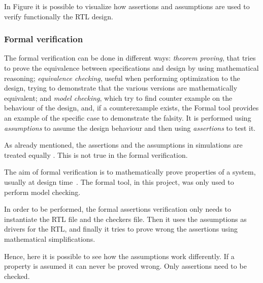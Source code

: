In Figure %
it is possible to visualize how assertions and assumptions are used to verify functionally the RTL design.

\subsubsection{Formal verification}
The formal verification can be done in different ways: \textit{theorem proving}, that tries to prove the equivalence between specifications and design by using mathematical reasoning; \textit{equivalence checking}, useful when performing optimization to the design, trying to demonstrate that the various versions are mathematically equivalent; and \textit{model checking}, which try to find counter example on the behaviour of the design, and, if a counterexample exists, the Formal tool provides an example of the specific case to demonstrate the falsity. It is performed using \emph{assumptions} to assume the design behaviour and then using \emph{assertions} to test it.


As already mentioned, the assertions and the assumptions in simulations are treated equally . This is not true in the formal verification.

The aim of formal veriﬁcation is to mathematically prove properties of a system, usually at design time~\cite{verification-book-2018-formal}.
The formal tool, in this project, was only used to perform model checking.

In order to be performed, the formal assertions verification only needs to instantiate the RTL file and the checkers file. Then it uses the assumptions as drivers for the RTL, and finally it tries to prove wrong the assertions using mathematical simplifications.

Hence, here it is possible to see how the assumptions work differently. If a property is assumed it can never be proved wrong. Only assertions need to be checked.

